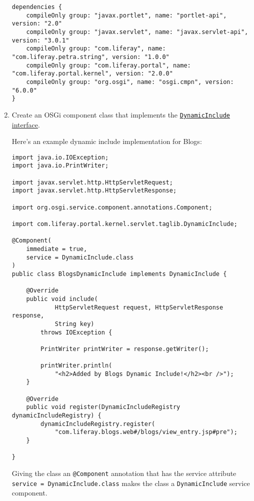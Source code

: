 \begin{enumerate}
\begin{verbatim}
dependencies {
    compileOnly group: "javax.portlet", name: "portlet-api", version: "2.0"
    compileOnly group: "javax.servlet", name: "javax.servlet-api", version: "3.0.1"
    compileOnly group: "com.liferay", name: "com.liferay.petra.string", version: "1.0.0"
    compileOnly group: "com.liferay.portal", name: "com.liferay.portal.kernel", version: "2.0.0"
    compileOnly group: "org.osgi", name: "osgi.cmpn", version: "6.0.0"
}
\end{verbatim}
\item
  Create an OSGi component class that implements the
  \href{https://docs.liferay.com/dxp/portal/7.2-latest/javadocs/portal-kernel/com/liferay/portal/kernel/servlet/taglib/DynamicInclude.html}{\texttt{DynamicInclude}
  interface}.

  Here's an example dynamic include implementation for Blogs:

\begin{verbatim}
import java.io.IOException;
import java.io.PrintWriter;

import javax.servlet.http.HttpServletRequest;
import javax.servlet.http.HttpServletResponse;

import org.osgi.service.component.annotations.Component;

import com.liferay.portal.kernel.servlet.taglib.DynamicInclude;

@Component(
    immediate = true,
    service = DynamicInclude.class
)
public class BlogsDynamicInclude implements DynamicInclude {

    @Override
    public void include(
            HttpServletRequest request, HttpServletResponse response,
            String key)
        throws IOException {

        PrintWriter printWriter = response.getWriter();

        printWriter.println(
            "<h2>Added by Blogs Dynamic Include!</h2><br />");
    }

    @Override
    public void register(DynamicIncludeRegistry dynamicIncludeRegistry) {
        dynamicIncludeRegistry.register(
            "com.liferay.blogs.web#/blogs/view_entry.jsp#pre");
    }

}
\end{verbatim}

  Giving the class an \texttt{@Component} annotation that has the
  service attribute \texttt{service\ =\ DynamicInclude.class} makes the
  class a \texttt{DynamicInclude} service component.


\end{enumerate}
